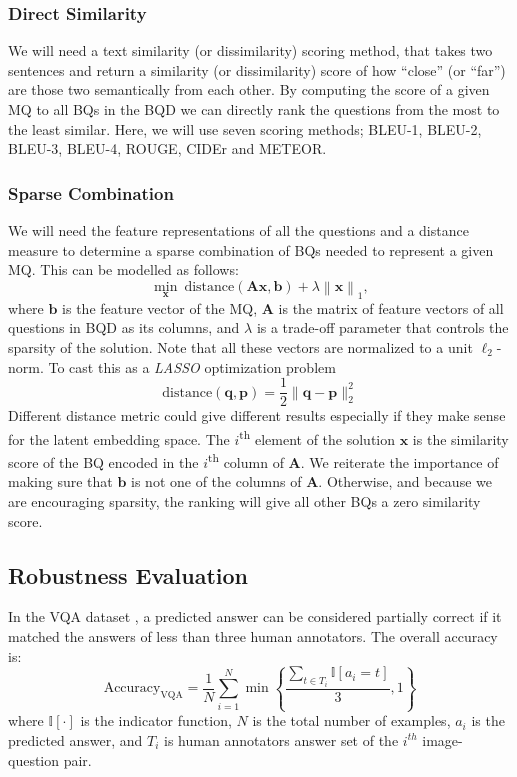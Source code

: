 \documentclass[letterpaper]{article}
\newcommand{\up}{}\def\up{\textsuperscript}
\newcommand{\lasso}{}\def\lasso/{\textit{LASSO}}
\begin{document}
\subsubsection{Direct Similarity} We will need a text similarity (or dissimilarity) scoring method, that takes two sentences and return a similarity (or dissimilarity) score of how ``close'' (or ``far'') are those two semantically from each other. By computing the score of a given MQ to all BQs in the BQD we can directly rank the questions from the most to the least similar. Here, we will use seven scoring methods; BLEU-1, BLEU-2, BLEU-3, BLEU-4, ROUGE, CIDEr and METEOR.

\subsubsection{Sparse Combination} We will need the feature representations of all the questions and a distance measure to determine a sparse combination of BQs needed to represent a given MQ. This can be modelled as follows:
\begin{equation}
	\min_{\mathbf{x}}~\text{distance}\left(\mathbf{A}\mathbf{x}, \mathbf{b} \right)+\lambda \left \| \mathbf{x} \right \|_{1},
	\label{eq:lasso}
\end{equation}
where $\mathbf{b}$ is the feature vector of the MQ, $\mathbf{A}$ is the matrix of feature vectors of all questions in BQD as its columns, and $\lambda$ is a trade-off parameter that controls the sparsity of the solution. Note that all these vectors are normalized to a unit $\ell_2$-norm. To cast this as a \lasso/ optimization problem
$$\text{distance}(\mathbf{q}, \mathbf{p}) = \frac{1}{2}\|\mathbf{q} - \mathbf{p}\|_2^2$$
Different distance metric could give different results especially if they make sense for the latent embedding space. The $i$\up{th} element of the solution $\mathbf{x}$ is the similarity score of the BQ encoded in the $i$\up{th} column of $\mathbf{A}$. We reiterate the importance of making sure that $\mathbf{b}$ is not one of the columns of $\mathbf{A}$. Otherwise, and because we are encouraging sparsity, the ranking will give all other BQs a zero similarity score.

\subsection{Robustness Evaluation}
In the VQA dataset \cite{4}, a predicted answer can be considered partially correct if it matched the answers of less than three human annotators. The overall accuracy is:
\begin{equation}
	\text{Accuracy}_\text{VQA}=\frac{1}{N}\sum_{i=1}^{N}\min\left \{ \frac{\sum_{t\in T_{i}}\mathbb{I}[a_{i}=t]}{3},1 \right \}
\end{equation}
where $\mathbb{I}[\cdot]$ is the indicator function, $N$ is the total number of examples, $a_{i}$ is the predicted answer, and $T_{i}$ is human annotators answer set of the $i^{th}$ image-question pair.
\end{document}
